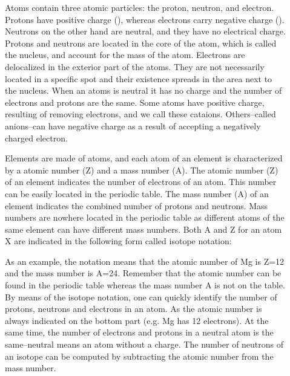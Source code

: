\documentclass[main.tex]{subfiles}
\begin{document}
   
\sloppy
\begin{description}
\item[] 
Atoms contain three atomic particles: the proton, neutron, and electron. Protons have positive charge (\ce{+}), whereas electrons carry negative charge (\ce{-}). Neutrons on the other hand are neutral, and they have no electrical charge. Protons and neutrons are located in the core of the atom, which is called the nucleus, and account for the mass of the atom. Electrons are delocalized in the exterior part of the atoms. They are not necessarily located in a specific spot and their existence spreads in the area next to the nucleus. When an atoms is neutral it has no charge and the number of electrons and protons are the same. Some atoms have positive charge, resulting of removing electrons, and we call these cataions. Others--called anions--can have negative charge as a result of accepting a negatively charged electron.
\item[] 
Elements are made of atoms, and each atom of an element is characterized by a atomic number (Z) and a mass number (A). The atomic number (Z) of an element indicates the number of electrons of an atom. This number can be easily located in the periodic table. The mass number (A) of an element indicates the combined number of protons and neutrons. Mass numbers are nowhere located in the periodic table as different atoms of the same element can have different mass numbers. Both A and Z for an atom X are indicated in the following form called isotope notation: 
\begin{center}\end{center} 
As an example, the notation   means that the atomic number of Mg is Z=12 and the mass number is A=24. Remember that the atomic number can be found in the periodic table whereas the mass number A is not on the table. By means of the isotope notation, one can quickly identify the number of protons, neutrons and electrons in an atom. As the atomic number is always indicated on the bottom part (e.g. Mg has 12 electrons). At the same time, the number of electrons and protons in a neutral atom is the same--neutral means an atom without a charge. The number of neutrons of an isotope can be computed by subtracting the atomic number from the mass number. 



\end{description}
\end{document}
